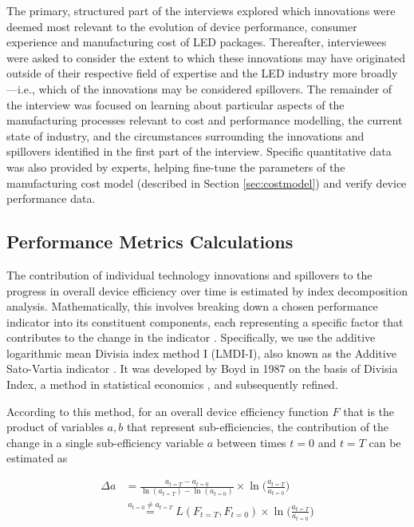 \documentclass[journal=jacsat,manuscript=article]{achemso}
\begin{document}
The primary, structured part of the interviews explored which innovations were deemed most relevant to the evolution of device performance, consumer experience and manufacturing cost of LED packages. Thereafter, interviewees were asked to consider the extent to which these innovations may have originated outside of their respective field of expertise and the LED industry more broadly—i.e., which of the innovations may be considered spillovers. The remainder of the interview was focused on learning about particular aspects of the manufacturing processes relevant to cost and performance modelling, the current state of industry, and the circumstances surrounding the innovations and spillovers identified in the first part of the interview. Specific quantitative data was also provided by experts, helping fine-tune the parameters of the manufacturing cost model (described in Section \ref{sec:costmodel}) and verify device performance data.

\subsection{Performance Metrics Calculations}
\label{subsec:metrics}

The contribution of individual technology innovations and spillovers to the progress in overall device efficiency over time is estimated by index decomposition analysis. Mathematically, this involves breaking down a chosen performance indicator into its constituent components, each representing a specific factor that contributes to the change in the indicator \cite{Ang1997}. Specifically, we use the additive logarithmic mean Divisia index method I (LMDI-I), also known as the Additive Sato-Vartia indicator \cite{deBoer2019}. It was developed by Boyd in 1987 \cite{Boyd1987} on the basis of Divisia Index, a method in statistical economics \cite{Diewert1988}, and subsequently refined.

According to this method, for an overall device efficiency function $F$ that is the product of variables $a, b$ that represent sub-efficiencies, the contribution of the change in a single sub-efficiency variable $a$ between times $t=0$ and $t=T$ can be estimated as \cite{Ang2019}

\begin{align}
    \Delta a &= \frac{a_{t=T} - a_{t=0}}{\ln(a_{t=T}) - \ln(a_{t=0})} \times \ln \big ( \frac{a_{t=T}}{a_{t=0}} \big ) \\
    & \stackrel{a_{t=0} \neq a_{t=T}}{=} L(F_{t=T}, F_{t=0}) \times \ln \big ( \frac{a_{t=T}}{a_{t=0}} \big )
\end{align}
\end{document}
